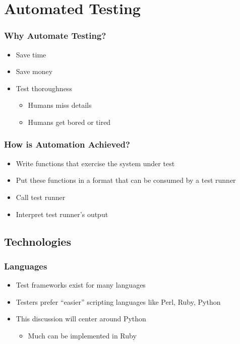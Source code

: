 \section{Automated Testing}

\begin{frame}
  \frametitle{Why Automate Testing?}
  \begin{itemize}
    \item Save time
    \item Save money
    \item Test thoroughness
    \begin{itemize}
      \item Humans miss details
      \item Humans get bored or tired
    \end{itemize}
  \end{itemize}
\end{frame}

\begin{frame}
  \frametitle{How is Automation Achieved?}
  \begin{itemize}
    \item Write functions that exercise the system under test
    \item Put these functions in a format that can be consumed by a test runner
    \item Call test runner
    \item Interpret test runner's output
  \end{itemize}
\end{frame}

\subsection{Technologies}

\begin{frame}
  \frametitle{Languages}
  \begin{itemize}
    \item Test frameworks exist for many languages
    \item Testers prefer ``easier'' scripting languages like Perl, Ruby, Python
    \item This discussion will center around Python
    \begin{itemize}
      \item Much can be implemented in Ruby
    \end{itemize}
  \end{itemize}
\end{frame}

